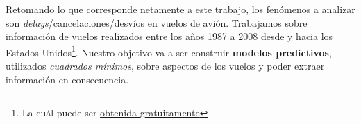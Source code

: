 Retomando lo que corresponde netamente a este trabajo, los fen\'omenos a analizar son \textit{delays}/cancelaciones/desv\'ios en vuelos de avi\'on. Trabajamos sobre informaci\'on de vuelos realizados entre los a\~nos 1987 a 2008 desde y hacia los Estados Unidos\footnote{La cu\'al puede ser \href{http://stat-computing.org/dataexpo/2009/the-data.html}{obtenida gratuitamente}}. Nuestro objetivo va a ser construir \textbf{modelos predictivos}, utilizados \textit{cuadrados m\'inimos}, sobre aspectos de los vuelos y poder extraer informaci\'on en consecuencia.
